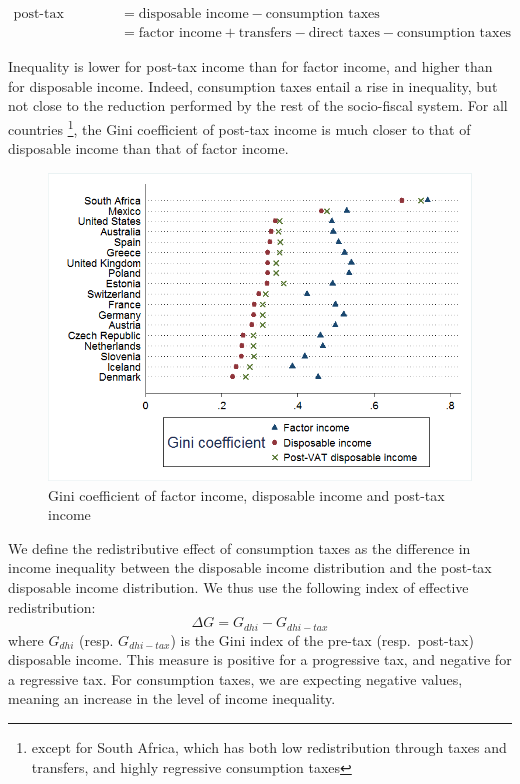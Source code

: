 \documentclass[12pt]{article}
\begin{document}
\begin{align*}
    \text{post-tax income}  &= \text{disposable income} - \text{consumption taxes} \\
                            &= \text{factor income} + \text{transfers} - \text{direct taxes} - \text{consumption taxes}
\end{align*}

Inequality is lower for post-tax income than for factor income, and higher than for disposable income. Indeed, consumption taxes entail a rise in inequality, but not close to the reduction performed by the rest of the socio-fiscal system. For all countries \footnote{except for South Africa, which has both low redistribution through taxes and transfers, and highly regressive consumption taxes}, the Gini coefficient of post-tax income is much closer to that of disposable income than that of factor income.

\begin{figure}
    \centering
    \includegraphics[height=0.42\textheight]{images/19-02_factor-dispo-post}
    \caption{Gini coefficient of factor income, disposable income and post-tax income}
    \label{fig:ginis}
\end{figure}

We define the redistributive effect of consumption taxes as the difference in income inequality between the disposable income distribution and the post-tax disposable income distribution. We thus use the following index of effective redistribution:
\[ \Delta G = G_{dhi} - G_{dhi-tax} \]
where $G_{dhi}$ (resp. $G_{dhi-tax}$) is the Gini index of the pre-tax (resp.\ post-tax) disposable income. This measure is positive for a progressive tax, and negative for a regressive tax. For consumption taxes, we are expecting negative values, meaning an increase in the level of income inequality.
\end{document}
